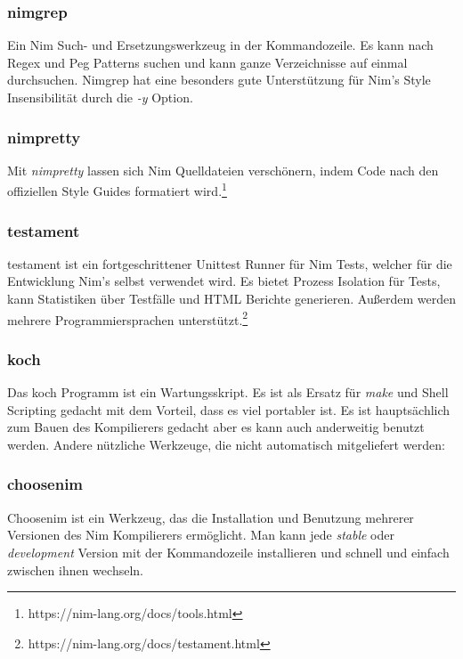 \documentclass[11pt]{report}
\begin{document}
\subsubsection{nimgrep}
Ein Nim Such- und Ersetzungswerkzeug in der Kommandozeile. Es kann nach Regex und Peg Patterns suchen und kann ganze Verzeichnisse auf einmal durchsuchen. Nimgrep hat eine besonders gute Unterstützung für Nim's Style Insensibilität durch die \emph{-y} Option.

\subsubsection{nimpretty}
Mit \emph{nimpretty} lassen sich Nim Quelldateien verschönern, indem Code nach den offiziellen Style Guides formatiert wird.\footnote{https://nim-lang.org/docs/tools.html}

\subsubsection{testament}
testament ist ein fortgeschrittener Unittest Runner für Nim Tests, welcher für die Entwicklung Nim's selbst verwendet wird. Es bietet Prozess Isolation für Tests, kann Statistiken über Testfälle und HTML Berichte generieren. Außerdem werden mehrere Programmiersprachen unterstützt.\footnote{https://nim-lang.org/docs/testament.html}

\subsubsection{koch}
Das koch Programm ist ein Wartungsskript. Es ist als Ersatz für \emph{make} und Shell Scripting gedacht mit dem Vorteil, dass es viel portabler ist. Es ist hauptsächlich zum Bauen des Kompilierers gedacht aber es kann auch anderweitig benutzt werden.
\newline\newline\newline
Andere nützliche Werkzeuge, die nicht automatisch mitgeliefert werden:

\subsubsection{choosenim}
Choosenim ist ein Werkzeug, das die Installation und Benutzung mehrerer Versionen des Nim Kompilierers ermöglicht. Man kann jede \emph{stable} oder \emph{development} Version mit der Kommandozeile installieren und schnell und einfach zwischen ihnen wechseln.
\end{document}
